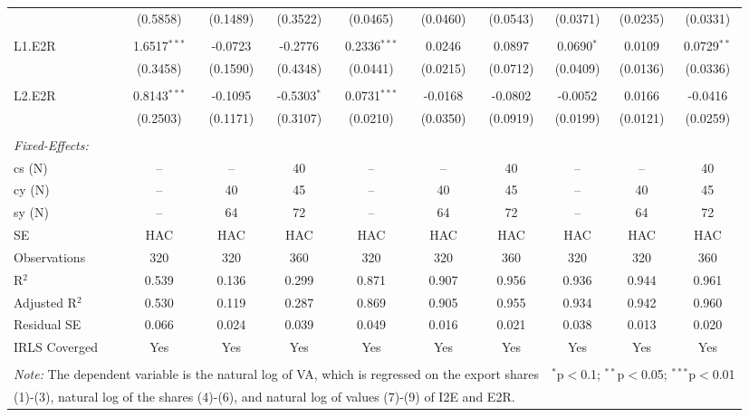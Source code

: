 \documentclass[a4paper]{article}
\begin{document}
\begin{table}[!htbp]
{\begin{tabular}[t]{lccccccccc}
  & (0.5858) & (0.1489) & (0.3522) & (0.0465) & (0.0460) & (0.0543) & (0.0371) & (0.0235) & (0.0331) \\ 
  & & & & & & & & & \\ 
 L1.E2R & 1.6517$^{***}$ & -0.0723 & -0.2776 & 0.2336$^{***}$ & 0.0246 & 0.0897 & 0.0690$^{*}$ & 0.0109 & 0.0729$^{**}$ \\ 
  & (0.3458) & (0.1590) & (0.4348) & (0.0441) & (0.0215) & (0.0712) & (0.0409) & (0.0136) & (0.0336) \\ 
  & & & & & & & & & \\ 
 L2.E2R & 0.8143$^{***}$ & -0.1095 & -0.5303$^{*}$ & 0.0731$^{***}$ & -0.0168 & -0.0802 & -0.0052 & 0.0166 & -0.0416 \\ 
  & (0.2503) & (0.1171) & (0.3107) & (0.0210) & (0.0350) & (0.0919) & (0.0199) & (0.0121) & (0.0259) \\ 
  & & & & & & & & & \\ 
\midrule \emph{Fixed-Effects:} &   &   &   &   &   &  \\
cs (N) & -- & -- & 40 & -- & -- & 40 & -- & -- & 40\\
cy (N) & -- & 40 & 45 & -- & 40 & 45 & -- & 40 & 45\\
sy (N) & -- & 64 & 72 & -- & 64 & 72 & -- & 64 & 72\\
\midrule
SE & HAC & HAC & HAC &HAC &HAC &HAC &HAC &HAC &HAC \\
Observations & 320 & 320 & 360 & 320 & 320 & 360 & 320 & 320 & 360 \\ 
R$^{2}$ & 0.539 & 0.136 & 0.299 & 0.871 & 0.907 & 0.956 & 0.936 & 0.944 & 0.961 \\ 
Adjusted R$^{2}$ & 0.530 & 0.119 & 0.287 & 0.869 & 0.905 & 0.955 & 0.934 & 0.942 & 0.960 \\ 
Residual SE & 0.066 & 0.024 & 0.039 & 0.049 & 0.016 & 0.021 & 0.038 & 0.013 & 0.020 \\ 
IRLS Coverged & Yes & Yes & Yes & Yes & Yes & Yes & Yes & Yes & Yes \\ \bottomrule \\[-1em]
\multicolumn{7}{l}{\small \textit{Note:} The dependent variable is the natural log of VA, which is regressed on the  export shares}   & \multicolumn{3}{r}{$^{*}$p$<$0.1; $^{**}$p$<$0.05; $^{***}$p$<$0.01} \\ [-0.2em]
\multicolumn{10}{l}{\small \quad \quad \quad (1)-(3), natural log of the shares (4)-(6), and natural log of values (7)-(9) of I2E and E2R.} \\
\end{tabular} 
}
\end{table} 
\FloatBarrier
\end{document}
